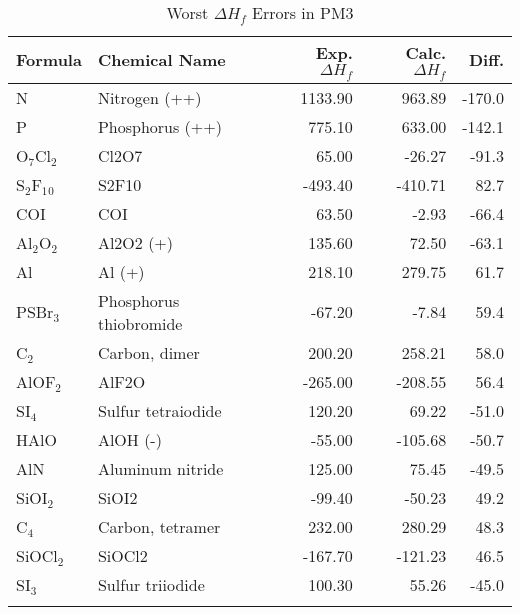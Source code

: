 \begin{table}
\caption{\label{wepm3} Worst $\Delta H_f$ Errors in PM3}
\compresstable
\begin{center}
\begin{tabular}{llrrr}
 Formula & Chemical Name & Exp. $\Delta H_f$ & Calc. $\Delta H_f$ & Diff.\\
 \hline
 N                    & Nitrogen (++)                          & 1133.90   &   963.89   & -170.0\\
 P                    & Phosphorus (++)                        &  775.10   &   633.00   & -142.1\\
 O$_7$Cl$_2$          & Cl2O7                                  &   65.00   &   -26.27   &  -91.3\\
 S$_2$F$_1$$_0$       & S2F10                                  & -493.40   &  -410.71   &   82.7\\
 COI                  & COI                                    &   63.50   &    -2.93   &  -66.4\\
 Al$_2$O$_2$          & Al2O2  (+)                             &  135.60   &    72.50   &  -63.1\\
 Al                   & Al (+)                                 &  218.10   &   279.75   &   61.7\\
 PSBr$_3$             & Phosphorus thiobromide                 &  -67.20   &    -7.84   &   59.4\\
 C$_2$                & Carbon, dimer                          &  200.20   &   258.21   &   58.0\\
 AlOF$_2$             & AlF2O                                  & -265.00   &  -208.55   &   56.4\\
 SI$_4$               & Sulfur tetraiodide                     &  120.20   &    69.22   &  -51.0\\
 HAlO                 & AlOH  (-)                              &  -55.00   &  -105.68   &  -50.7\\
 AlN                  & Aluminum nitride                       &  125.00   &    75.45   &  -49.5\\
 SiOI$_2$             & SiOI2                                  &  -99.40   &   -50.23   &   49.2\\
 C$_4$                & Carbon, tetramer                       &  232.00   &   280.29   &   48.3\\
 SiOCl$_2$            & SiOCl2                                 & -167.70   &  -121.23   &   46.5\\
 SI$_3$               & Sulfur triiodide                       &  100.30   &    55.26   &  -45.0\\
$$
\end{tabular}
\end{center}
\end{table}
